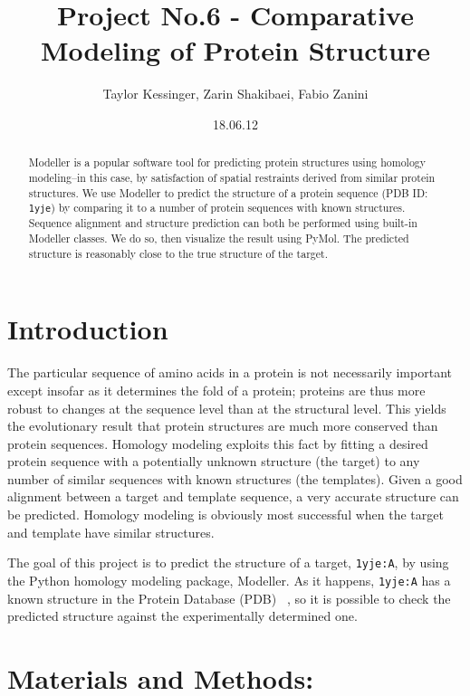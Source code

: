 \documentclass[]{report}   %
\begin{document}
\title{Project No.6 - Comparative Modeling of Protein Structure}
\author{Taylor Kessinger, Zarin Shakibaei, Fabio Zanini}   
\date{18.06.12}
\maketitle

\begin{abstract}

Modeller is a popular software tool for predicting protein structures using homology modeling–in this case, by satisfaction of spatial restraints derived from similar protein structures. We use Modeller to predict the structure of a protein sequence (PDB ID: \texttt{1yje}) by comparing it to a number of protein sequences with known structures. Sequence alignment and structure prediction can both be performed using built-in Modeller classes. We do so, then visualize the result using PyMol. The predicted structure is reasonably close to the true structure of the target.

\end{abstract}

\section*{Introduction}   

The particular sequence of amino acids in a protein is not necessarily important except insofar as it determines the fold of a protein; proteins are thus more robust to changes at the sequence level than at the structural level. This yields the evolutionary result that protein structures are much more conserved than protein sequences. Homology modeling exploits this fact by fitting a desired protein sequence with a potentially unknown structure (the target) to any number of similar sequences with known structures (the templates). Given a good alignment between a target and template sequence, a very accurate structure can be predicted. Homology modeling is obviously most successful when the target and template have similar structures.

The goal of this project is to predict the structure of a target, \texttt{1yje:A}, by using the Python homology modeling package, Modeller. As it happens, \texttt{1yje:A} has a known structure in the Protein Database (PDB) ~\cite{flaig1yje}, so it is possible to check the predicted structure against the experimentally determined one.
 
\section*{Materials and Methods:}   
\end{document}
